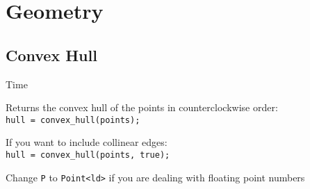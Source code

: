 \section{Geometry}


\subsection{Convex Hull}
 Time

Returns the convex hull of the points in counterclockwise order: \\
\verb|hull = convex_hull(points);|

If you want to include collinear edges: \\
\verb|hull = convex_hull(points, true);|

Change \verb|P| to \verb|Point<ld>| if you are dealing with floating point numbers

